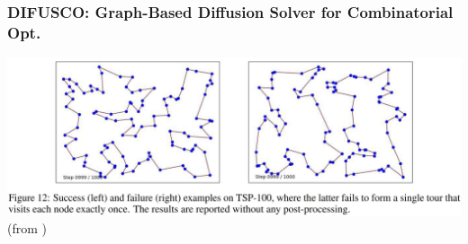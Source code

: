 \documentclass[aspectratio=1610]{beamer}
\begin{document}
\begin{frame}
	\frametitle{DIFUSCO: Graph-Based Diffusion Solver for Combinatorial Opt.}

	\begin{center}
		\includegraphics[width=\textwidth]{graphics/difusco2.jpg}
		(from \citet{sun-23})
	\end{center}
\end{frame}
\end{document}
